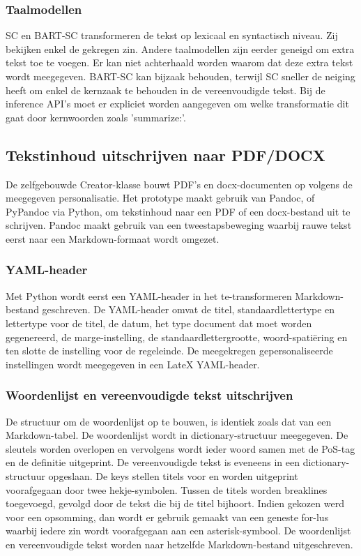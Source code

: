 \subsubsection{Taalmodellen}

SC en BART-SC transformeren de tekst op lexicaal en syntactisch niveau. Zij bekijken enkel de gekregen zin. Andere taalmodellen zijn eerder geneigd om extra tekst toe te voegen. Er kan niet achterhaald worden waarom dat deze extra tekst wordt meegegeven. BART-SC kan bijzaak behouden, terwijl SC sneller de neiging heeft om enkel de kernzaak te behouden in de vereenvoudigde tekst. Bij de inference API's moet er expliciet worden aangegeven om welke transformatie dit gaat door kernwoorden zoals 'summarize:'.

\subsection{Tekstinhoud uitschrijven naar PDF/DOCX}

De zelfgebouwde Creator-klasse bouwt PDF's en docx-documenten op volgens de meegegeven personalisatie. Het prototype maakt gebruik van Pandoc, of PyPandoc via Python, om tekstinhoud naar een PDF of een docx-bestand uit te schrijven. Pandoc maakt gebruik van een tweestapsbeweging waarbij rauwe tekst eerst naar een Markdown-formaat wordt omgezet.

\subsubsection{YAML-header}

Met Python wordt eerst een YAML-header in het te-transformeren Markdown-bestand geschreven. De YAML-header omvat de titel, standaardlettertype en lettertype voor de titel, de datum, het type document dat moet worden gegenereerd, de marge-instelling, de standaardlettergrootte, woord-spatiëring en ten slotte de instelling voor de regeleinde. De meegekregen gepersonaliseerde instellingen wordt meegegeven in een LateX YAML-header. 

\subsubsection{Woordenlijst en vereenvoudigde tekst uitschrijven}

De structuur om de woordenlijst op te bouwen, is identiek zoals dat van een Markdown-tabel. De  woordenlijst wordt in dictionary-structuur meegegeven. De sleutels worden overlopen en vervolgens wordt ieder woord samen met de PoS-tag en de definitie uitgeprint. De vereenvoudigde tekst is eveneens in een dictionary-structuur opgeslaan. De keys stellen titels voor en worden uitgeprint voorafgegaan door twee hekje-symbolen. Tussen de titels worden breaklines toegevoegd, gevolgd door de tekst die bij de titel bijhoort. Indien gekozen werd voor een opsomming, dan wordt er gebruik gemaakt van een geneste for-lus waarbij iedere zin wordt voorafgegaan aan een asterisk-symbool. De woordenlijst en vereenvoudigde tekst worden naar hetzelfde Markdown-bestand uitgeschreven. 

